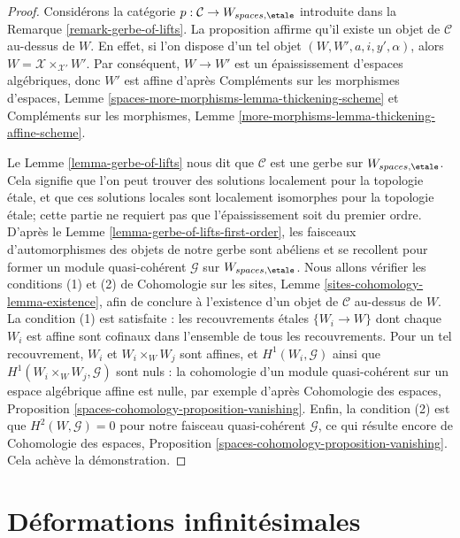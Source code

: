 \begin{proof}
Considérons la catégorie $p : \mathcal{C} \to W_{spaces, \etale}$
introduite dans la Remarque \ref{remark-gerbe-of-lifts}.
La proposition affirme qu'il existe un objet de $\mathcal{C}$
au-dessus de $W$. En effet, si l'on dispose d'un tel objet
$(W, W', a, i, y', \alpha)$, alors $W = \mathcal{X} \times_{\mathcal{X}'} W'$.
Par conséquent, $W \to W'$ est un épaississement d'espaces algébriques, donc
$W'$ est affine d'après
Compléments sur les morphismes d'espaces, Lemme
\ref{spaces-more-morphisms-lemma-thickening-scheme}
et Compléments sur les morphismes, Lemme
\ref{more-morphisms-lemma-thickening-affine-scheme}.

\medskip\noindent
Le Lemme \ref{lemma-gerbe-of-lifts} nous dit que $\mathcal{C}$ est une gerbe sur
$W_{spaces, \etale}$. Cela signifie que l'on peut trouver des solutions localement pour la topologie \'etale,
et que ces solutions locales sont localement isomorphes pour la topologie \'etale;
cette partie ne requiert pas que l'épaississement soit du premier ordre.
D'après le Lemme \ref{lemma-gerbe-of-lifts-first-order},
les faisceaux d'automorphismes des objets de notre gerbe sont abéliens et
se recollent pour former un module quasi-cohérent $\mathcal{G}$
sur $W_{spaces, \etale}$. Nous allons vérifier les conditions (1) et (2)
de Cohomologie sur les sites, Lemme \ref{sites-cohomology-lemma-existence},
afin de conclure à l'existence d'un objet de $\mathcal{C}$ au-dessus de $W$.
La condition (1) est satisfaite : les recouvrements \'etales $\{W_i \to W\}$
dont chaque $W_i$ est affine sont cofinaux dans l'ensemble de tous les recouvrements.
Pour un tel recouvrement, $W_i$ et $W_i \times_W W_j$ sont affines,
et $H^1(W_i, \mathcal{G})$ ainsi que $H^1(W_i \times_W W_j, \mathcal{G})$
sont nuls : la cohomologie d'un module quasi-cohérent sur un
espace algébrique affine est nulle, par exemple d'après Cohomologie des espaces, Proposition
\ref{spaces-cohomology-proposition-vanishing}.
Enfin, la condition (2) est que $H^2(W, \mathcal{G}) = 0$
pour notre faisceau quasi-cohérent $\mathcal{G}$, ce qui résulte encore
de Cohomologie des espaces, Proposition
\ref{spaces-cohomology-proposition-vanishing}.
Cela achève la démonstration.
\end{proof}






\section{Déformations infinitésimales}
\label{section-inf}

